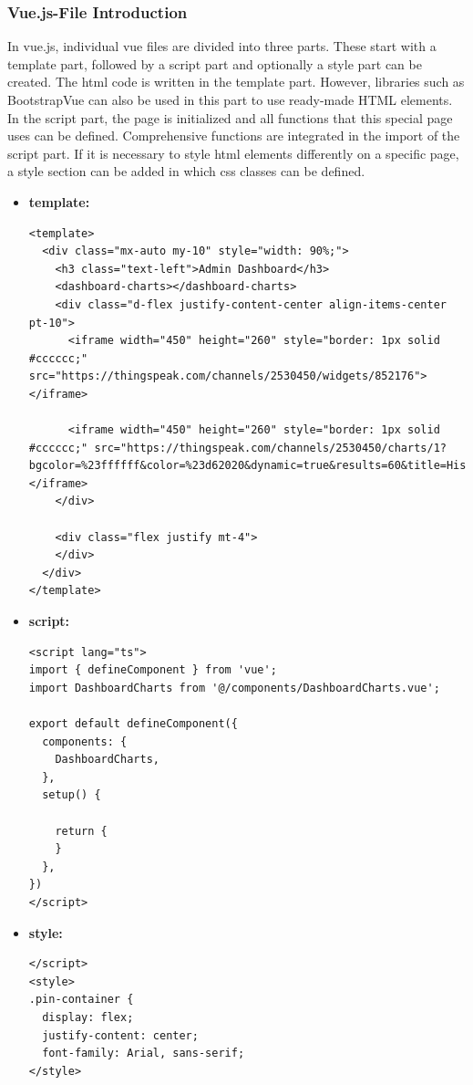 \subsubsection{Vue.js-File Introduction}
In vue.js, individual vue files are divided into three parts. These start with a template part, followed by a script part and optionally a style part can be created.
The html code is written in the template part. However, libraries such as BootstrapVue can also be used in this part to use ready-made HTML elements. In the script part, the page is initialized and all functions that this special page uses can be defined. Comprehensive functions are integrated in the import of the script part. If it is necessary to style html elements differently on a specific page, a style section can be added in which css classes can be defined.
\begin{itemize}
\item \textbf{template:}
\begin{lstlisting}
<template>
  <div class="mx-auto my-10" style="width: 90%;">
    <h3 class="text-left">Admin Dashboard</h3>
    <dashboard-charts></dashboard-charts>
    <div class="d-flex justify-content-center align-items-center pt-10">
      <iframe width="450" height="260" style="border: 1px solid #cccccc;" src="https://thingspeak.com/channels/2530450/widgets/852176"></iframe>

      <iframe width="450" height="260" style="border: 1px solid #cccccc;" src="https://thingspeak.com/channels/2530450/charts/1?bgcolor=%23ffffff&color=%23d62020&dynamic=true&results=60&title=History+of+Wattage&type=line"></iframe>
    </div>

    <div class="flex justify mt-4">
    </div>
  </div>
</template>
    \end{lstlisting}

\item \textbf{script:}
\begin{lstlisting}
<script lang="ts">
import { defineComponent } from 'vue';
import DashboardCharts from '@/components/DashboardCharts.vue';

export default defineComponent({
  components: {
    DashboardCharts,
  },
  setup() {

    return {
    }
  },
})
</script>
    \end{lstlisting}
\item \textbf{style:}
\begin{lstlisting}
</script>
<style>
.pin-container {
  display: flex;
  justify-content: center;
  font-family: Arial, sans-serif;
</style>
    \end{lstlisting}
\end{itemize}

